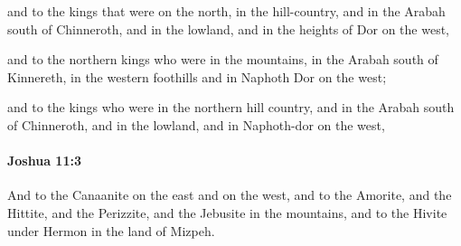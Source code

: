 			\begin{versebox}
					\item[BHS] 
					\item[ASV] and to the kings that were on the north, in the hill-country, and in the Arabah south of Chinneroth, and in the lowland, and in the heights of Dor on the west,
					\item[NIV] and to the northern kings who were in the mountains, in the Arabah south of Kinnereth, in the western foothills and in Naphoth Dor on the west;
					\item[NRSV] and to the kings who were in the northern hill country, and in the Arabah south of Chinneroth, and in the lowland, and in Naphoth-dor on the west,
			\end{versebox}

		\paragraph{Joshua 11:3} %
			\label{JOSHUA-11-3}

			And to the Canaanite on the east and on the west, and to the Amorite, and the Hittite, and the Perizzite, and the Jebusite in the mountains, and to the Hivite under Hermon in the land of Mizpeh.

